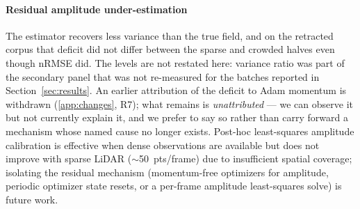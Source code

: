 \documentclass[review]{elsarticle}
\begin{document}
\paragraph{Residual amplitude under-estimation}
The estimator recovers less variance
than the true field, and on the retracted corpus that deficit did not differ between
the sparse and crowded halves even though nRMSE did. The levels are not restated
here: variance ratio was part of the secondary panel that was not re-measured for
the batches reported in Section~\ref{sec:results}. An earlier attribution of the
deficit to Adam momentum is withdrawn (\ref{app:changes}, R7); what remains is
\emph{unattributed} --- we can observe it but not currently explain it, and we prefer
to say so rather than carry forward a mechanism whose named cause no longer exists.
Post-hoc
least-squares amplitude calibration is effective when dense observations
are available but does not improve with sparse LiDAR ($\sim$50~pts/frame)
due to insufficient spatial coverage; isolating the residual mechanism
(momentum-free optimizers for amplitude, periodic optimizer state resets,
or a per-frame amplitude least-squares solve) is future work.
\end{document}
